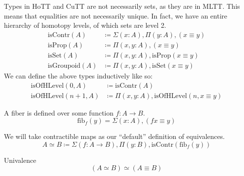 \begin{romdefinition} \label{homotopy-types}
  Types in HoTT and CuTT are not necessarily sets, as they are in MLTT.
  This means that equalities are not necessarily unique.
  In fact, we have an entire hierarchy of homotopy levels, of which sets are
  level 2.
  \begin{align}
    \text{isContr}(A)    &\coloneqq \Sigma(x : A) , \Pi(y : A) , (x \equiv y) \\
    \text{isProp}(A)     &\coloneqq \Pi(x, y : A) , (x \equiv y) \\
    \text{isSet}(A)      &\coloneqq \Pi(x, y : A) , \text{isProp}(x \equiv y) \\
    \text{isGroupoid}(A) &\coloneqq \Pi(x, y : A) , \text{isSet}(x \equiv y)
  \end{align}
  We can define the above types inductively like so:
  \begin{align}
    \text{isOfHLevel}(0 , A) &\coloneqq \text{isContr}(A) \\
    \text{isOfHLevel}(n+1 , A) &\coloneqq \Pi(x , y : A) , \text{isOfHLevel}(n , x \equiv y)
  \end{align}
\end{romdefinition}
\begin{romdefinition}[Fibers] \label{fibers}
  A fiber is defined over some function \(f : A \rightarrow B\).
  \begin{equation}
    \text{fib}_f(y) = \Sigma(x : A) , (f x \equiv y)
  \end{equation}
\end{romdefinition}
\begin{romdefinition}[Equivalences] \label{equivalences}
  We will take contractible maps \cite[definition 4.4.1]{hottbook} as our
  ``default'' definition of equivalences.
  \begin{equation}
    A \simeq B \coloneqq \Sigma(f : A \rightarrow B) , \Pi(y : B) , \text{isContr}(\text{fib}_f(y))
  \end{equation}
\end{romdefinition}
\begin{romlemma}
  Univalence
  \begin{equation}
    (A \simeq B) \simeq (A \equiv B)
  \end{equation}
\end{romlemma}
